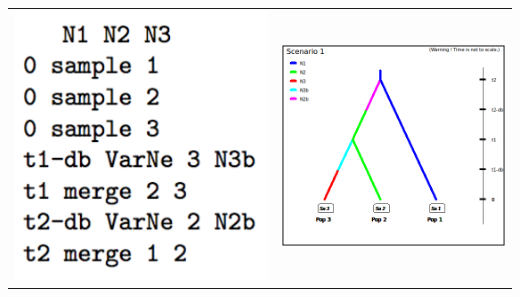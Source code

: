 \begin{center} 
\begin{tabular}{cc}
\includegraphics[scale=0.5]{code_scenario_05-1.pdf} & \includegraphics[scale=0.4]{test3pop_scenario_1.png} \\
\end{tabular}
\end{center}

